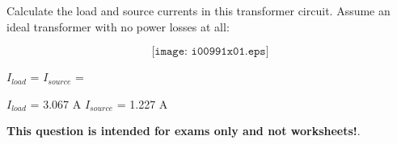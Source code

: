 

Calculate the load and source currents in this transformer circuit.  Assume an ideal transformer with no power losses at all:

$$\texttt{[image: i00991x01.eps]}$$

$I_{load}$ = \hskip 80pt $I_{source}$ = 

\vskip 10pt







$I_{load}$ = 3.067 A \hskip 80pt $I_{source}$ = 1.227 A







{\bf This question is intended for exams only and not worksheets!}.



